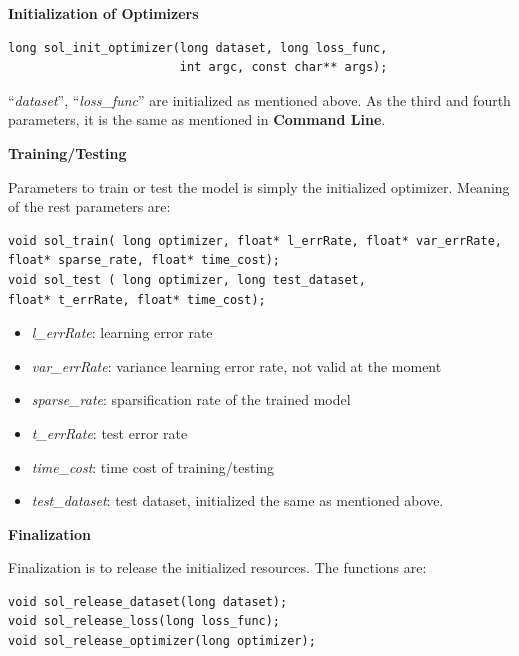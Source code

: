 \documentclass[11pt,a4paper]{article}
\newlength{\wideitemsep}
\let\olditem\item
\renewcommand{\item}{\setlength{\itemsep}{\wideitemsep}\olditem}
\begin{document}
\vspace{4mm}\hspace{-5mm}\textbf{Initialization of Optimizers}
\vspace{2mm}
\lstset{language=C++}
\begin{lstlisting}
long sol_init_optimizer(long dataset, long loss_func, 
                        int argc, const char** args);
\end{lstlisting}
``\emph{dataset}'', ``\emph{loss\_func}'' are initialized as mentioned above.
As the third and fourth parameters, it is the same as mentioned in
\textbf{Command Line}.

\vspace{4mm}\hspace{-5mm}\textbf{Training/Testing}
\vspace{2mm}

Parameters to train or test the model is simply the initialized optimizer.
Meaning of the rest parameters are:
\lstset{language=C++}
\begin{lstlisting}
void sol_train( long optimizer, float* l_errRate, float* var_errRate, 
float* sparse_rate, float* time_cost);
void sol_test ( long optimizer, long test_dataset,  
float* t_errRate, float* time_cost);
\end{lstlisting}


\begin{itemize}
    \item \emph{l\_errRate}: learning error rate
    \item \emph{var\_errRate}: variance learning error rate, not valid at the
        moment
    \item \emph{sparse\_rate}: sparsification rate of the trained model
    \item \emph{t\_errRate}: test error rate
    \item \emph{time\_cost}: time cost of training/testing
    \item \emph{test\_dataset}: test dataset, initialized the same as mentioned
        above.
\end{itemize}

\vspace{4mm}\hspace{-5mm}\textbf{Finalization}
\vspace{2mm}

Finalization is to release the initialized resources. The functions are:
\lstset{language=C++}
\begin{lstlisting}
void sol_release_dataset(long dataset);
void sol_release_loss(long loss_func);
void sol_release_optimizer(long optimizer);
\end{lstlisting}
\end{document}
